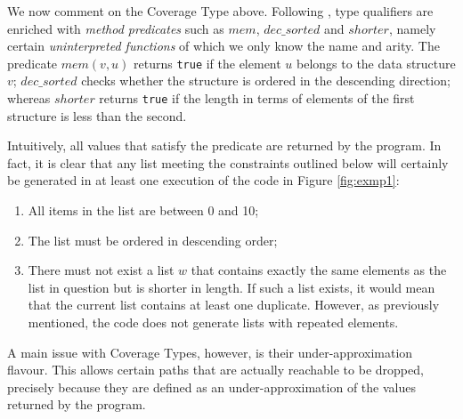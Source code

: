 We now comment on the Coverage Type above. Following \cite{coverage}, type qualifiers are enriched with \emph{method predicates} such as $mem$, $dec\_sorted$ and $shorter$, namely certain \emph{uninterpreted functions} of which we only know the name and arity. The predicate $mem(v, u)$ returns \verb|true| if the element $u$ belongs to the data structure $v$; $dec\_sorted$ checks whether the structure is ordered in the descending direction; whereas $shorter$ returns \verb|true| if the length in terms of elements of the first structure is less than the second.

Intuitively, all values that satisfy the predicate are returned by the program. In fact, it is clear that any list meeting the constraints outlined below will certainly be generated in at least one execution of the code in Figure \ref{fig:exmp1}:
\begin{enumerate}
    \item All items in the list are between 0 and 10;
    \item The list must be ordered in descending order;
    \item There must not exist a list $w$ that contains exactly the same elements as the list in question but is shorter in length. If such a list exists, it would mean that the current list contains at least one duplicate. However, as previously mentioned, the code does not generate lists with repeated elements.
\end{enumerate}

A main issue with Coverage Types, however, is their under-approximation flavour. This allows certain paths that are actually reachable to be dropped, precisely because they are defined as an under-approximation of the values returned by the program.

